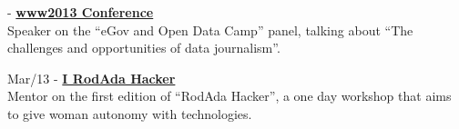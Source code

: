 \documentclass[]{friggeri-cv}
\begin{document}
{\footnotesize{}} -{} \href{https://www2013.org/}{\textbf{www2013 Conference}}\\
           {Speaker on the ``eGov and Open Data Camp'' panel, talking about ``The challenges and opportunities of data journalism''}.


{\footnotesize{Mar/13}} -{} \href{https://rodadahacker.com/}{\textbf{I RodAda Hacker}}\\
%
           {Mentor on the first edition of ``RodAda Hacker'', a one day workshop that aims to give woman autonomy with technologies}.



\end{document}
